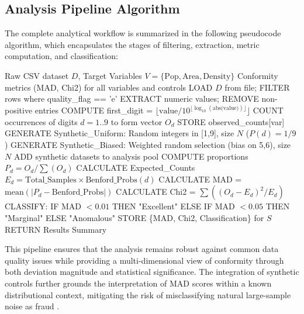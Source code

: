 \documentclass[11pt,a4paper]{article}
\begin{document}
\subsection{Analysis Pipeline Algorithm}

The complete analytical workflow is summarized in the following pseudocode algorithm, which encapsulates the stages of filtering, extraction, metric computation, and classification:

\begin{algorithm}[t]
\caption{Benford Conformity Analysis}
\label{alg:benford_analysis}
\begin{algorithmic}[1]
\Require Raw CSV dataset $D$, Target Variables $V = \{\text{Pop}, \text{Area}, \text{Density}\}$
\Ensure Conformity metrics (MAD, Chi2) for all variables and controls
\State LOAD $D$ from file; FILTER rows where quality\_flag == 'e'
    \State EXTRACT numeric values; REMOVE non-positive entries
    \State COMPUTE first\_digit = $\lfloor \text{value} / 10^{\lfloor \log_{10}(\text{abs(value)}) \rfloor} \rfloor$
    \State COUNT occurrences of digits $d=1..9$ to form vector $O_d$
    \State STORE observed\_counts[var]
\EndFor
\State GENERATE Synthetic\_Uniform: Random integers in [1,9], size $N$ ($P(d)=1/9$)
\State GENERATE Synthetic\_Biased: Weighted random selection (bias on 5,6), size $N$
\State ADD synthetic datasets to analysis pool
    \State COMPUTE proportions $P_d = O_d / \sum(O_d)$
    \State CALCULATE Expected\_Counts $E_d = \text{Total\_Samples} \times \text{Benford\_Probs}(d)$
    \State CALCULATE MAD = $\text{mean}(|P_d - \text{Benford\_Probs}|)$
    \State CALCULATE Chi2 = $\sum((O_d - E_d)^2 / E_d)$
    \State CLASSIFY: IF MAD $< 0.01$ THEN "Excellent" ELSE IF MAD $< 0.05$ THEN "Marginal" ELSE "Anomalous"
    \State STORE \{MAD, Chi2, Classification\} for $S$
\EndFor
\State RETURN Results Summary
\end{algorithmic}
\end{algorithm}

This pipeline ensures that the analysis remains robust against common data quality issues while providing a multi-dimensional view of conformity through both deviation magnitude and statistical significance. The integration of synthetic controls further grounds the interpretation of MAD scores within a known distributional context, mitigating the risk of misclassifying natural large-sample noise as fraud \cite{Silva2024ANA}.
\end{document}
